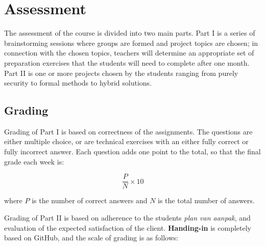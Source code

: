 \section{Assessment}
	The assessment of the course is divided into two main parts. Part I is a series of brainstorming sessions where groups are formed and project topics are chosen; in connection with the chosen topics, teachers will determine an appropriate set of preparation exercises that the students will need to complete after one month. Part II is one or more projects chosen by the students ranging from purely security to formal methods to hybrid solutions.


	\subsection{Grading}
		Grading of Part I is based on correctness of the assignments. The questions are either multiple choice, or are technical exercises with an either fully correct or fully incorrect answer. Each question adds one point to the total, so that the final grade each week is:
		
			$$\frac{P}{N}\times 10$$
	
		where $P$ is the number of correct answers and $N$ is the total number of answers.
		
		Grading of Part II is based on adherence to the students \textit{plan van aanpak}, and evaluation of the expected satisfaction of the client. \textbf{Handing-in} is completely based on GitHub, and the scale of grading is as follows:
		
